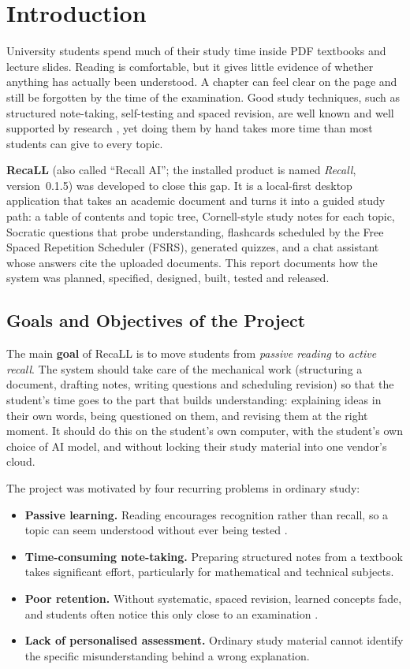 \chapter{Introduction}\label{ch:intro}

University students spend much of their study time inside PDF textbooks and lecture
slides. Reading is comfortable, but it gives little evidence of whether anything has
actually been understood. A chapter can feel clear on the page and still be forgotten
by the time of the examination. Good study techniques, such as structured note-taking,
self-testing and spaced revision, are well known and well supported by research
\cite{roediger2006,cepeda2006,dunlosky2013}, yet doing them by hand takes more time
than most students can give to every topic.

\textbf{RecaLL} (also called ``Recall AI''; the installed product is named
\emph{Recall}, version~0.1.5) was developed to close this gap. It is a local-first
desktop application that takes an academic document and turns it into a guided study
path: a table of contents and topic tree, Cornell-style study notes for each topic,
Socratic questions that probe understanding, flashcards scheduled by the Free Spaced
Repetition Scheduler (FSRS), generated quizzes, and a chat assistant whose answers cite
the uploaded documents. This report documents how the system was planned, specified,
designed, built, tested and released.

\section{Goals and Objectives of the Project}

The main \textbf{goal} of RecaLL is to move students from \emph{passive reading} to
\emph{active recall}. The system should take care of the mechanical work (structuring a
document, drafting notes, writing questions and scheduling revision) so that the
student's time goes to the part that builds understanding: explaining ideas in their
own words, being questioned on them, and revising them at the right moment. It should
do this on the student's own computer, with the student's own choice of AI model, and
without locking their study material into one vendor's cloud.

The project was motivated by four recurring problems in ordinary study:
\begin{itemize}
  \item \textbf{Passive learning.} Reading encourages recognition rather than recall, so
  a topic can seem understood without ever being tested \cite{roediger2006}.
  \item \textbf{Time-consuming note-taking.} Preparing structured notes from a textbook
  takes significant effort, particularly for mathematical and technical subjects.
  \item \textbf{Poor retention.} Without systematic, spaced revision, learned concepts
  fade, and students often notice this only close to an examination \cite{cepeda2006}.
  \item \textbf{Lack of personalised assessment.} Ordinary study material cannot identify
  the specific misunderstanding behind a wrong explanation.
\end{itemize}

